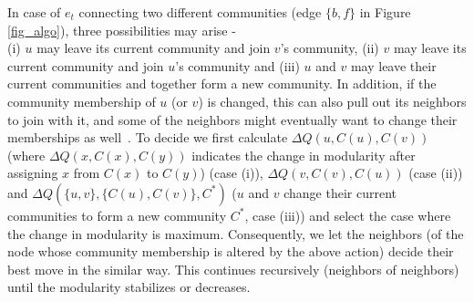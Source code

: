 In case of $e_t$ connecting two different communities (edge $\{b,f\}$ in Figure \ref{fig_algo}), three possibilities may arise - \\
(i) $u$ may leave its current community and join $v$'s community, (ii) $v$ may leave its current community and join $u$'s community and (iii) $u$ and $v$ may leave their current communities and together form a new community. In addition, if the community membership of $u$ (or $v$) is changed, this can also pull out its neighbors to join with it, and some of the neighbors might eventually want to change their memberships as well~\cite{pone.0091431}. To decide we first calculate $\Delta Q(u,C(u),C(v))$ (where $\Delta Q(x,C(x),C(y))$ indicates the change in modularity after assigning $x$ from $C(x)$ to $C(y)$) (case (i)), $\Delta Q(v,C(v),C(u))$ (case (ii)) and $\Delta Q(\{u,v\},\{C(u),C(v)\},C^{\ast})$ ($u$ and $v$ change their current communities to form a new community $C^{\ast}$, case (iii)) and select the case where the change in modularity is maximum. Consequently, we let the neighbors (of the node whose community membership is altered by the above action) decide their best move in the similar way. This continues recursively (neighbors of neighbors) until the modularity stabilizes or decreases.  


